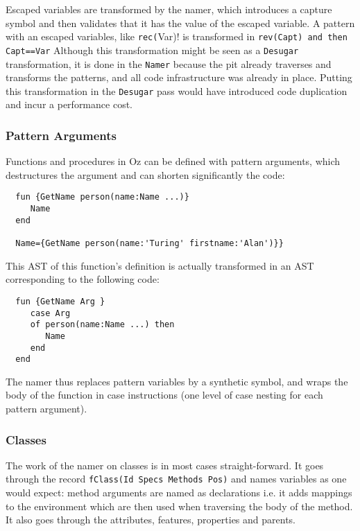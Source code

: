 \documentclass[a4paper]{memoir}
\begin{document}
Escaped variables are transformed by the namer, which introduces a capture
symbol and then validates that it has the value of the escaped variable.
 A pattern with an escaped variables, like \lstinline!rec(!Var)! is
transformed in \lstinline!rev(Capt) and then Capt==Var!
Although this transformation might be seen as a \lstinline!Desugar! transformation, it is
done in the \lstinline!Namer! because the pit already traverses and transforms the
patterns, and all code infrastructure was already in place. Putting this
transformation in the \lstinline!Desugar! pass would have introduced code duplication and
incur a performance cost.


\subsubsection{Pattern Arguments}
Functions and procedures in Oz can be defined with pattern arguments, which
destructures the argument and can shorten significantly the code:
\begin{lstlisting}
  fun {GetName person(name:Name ...)}
     Name
  end

  Name={GetName person(name:'Turing' firstname:'Alan')}}
\end{lstlisting}

This AST of this function's definition is actually transformed in an AST corresponding to the following code:
\begin{lstlisting}
  fun {GetName Arg }
     case Arg
     of person(name:Name ...) then
        Name
     end
  end
\end{lstlisting}

The namer thus replaces pattern variables by a synthetic symbol, and wraps the body of the function in case instructions (one level of case nesting for each pattern argument). 




\subsubsection{Classes}\label{sec:arch:namer:classes}
The work of the namer on classes is in most cases straight-forward. It goes through the record
\lstinline!fClass(Id Specs Methods Pos)! and names variables as one would expect:
method arguments are named as declarations i.e. it adds mappings to the
environment which are then used when traversing the body of the method.
It also goes through the attributes, features, properties and parents.
\end{document}
